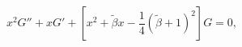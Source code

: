 \begin{equation}
x^2 G'' + x G' +\left[x^2+\tilde{\beta}x -\frac{1}{4} (\tilde{
\beta}+1)^2\right]G=0,
\label{sammy}
\end{equation}


